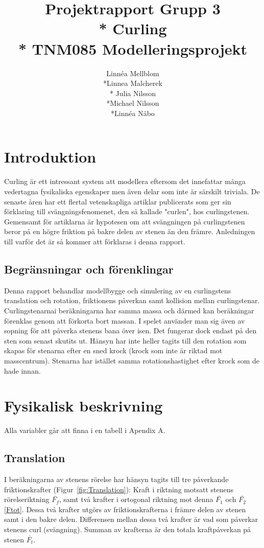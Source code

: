 \documentclass[11pt]{article} %
\title{Projektrapport Grupp 3 \\* 
Curling\\*
TNM085 Modelleringsprojekt}
\author{Linnéa Mellblom\\*Linnea Malcherek\\* Julia Nilsson\\*Michael Nilsson\\*Linnéa Nåbo}
\begin{document}
\maketitle
\pagebreak
{}  

\pagebreak
\tableofcontents
\pagebreak

\section{Introduktion}
Curling är ett intressant system att modellera eftersom det innefattar många vedertagna fysikaliska egenskaper men även delar som inte är särskilt triviala. 
De senaste åren har ett flertal vetenskapliga artiklar publicerats som ger sin förklaring till svängningsfenomenet, den så kallade "curlen", hos curlingstenen.
Gemensamt för artiklarna är hypotesen om att svängningen på curlingstenen beror på en högre friktion på bakre delen av stenen än den främre. 
Anledningen till varför det är så kommer att förklaras i denna rapport.

\subsection{Begränsningar och förenklingar} 
Denna rapport behandlar modellbygge och simulering av en curlingstens translation
och rotation, friktionens påverkan samt kollision mellan curlingstenar. 
Curlingstenarnai beräkningarna har samma massa och därmed kan beräkningar förenklas genom att
förkorta bort massan. I spelet använder man sig även av sopning för att påverka stenens
bana över isen. Det fungerar dock endast på den sten som senast skutits ut. Hänsyn har
inte heller tagits till den rotation som skapas för stenarna efter en sned krock (krock som
inte är riktad mot masscentrum). Stenarna har istället samma rotationshastighet efter
krock som de hade innan.

\section{Fysikalisk beskrivning} 

Alla variabler går att finna i en tabell i Apendix A.

\subsection{Translation}

I beräkningarna av stenens rörelse har hänsyn tagits till tre påverkande friktionskrafter (Figur~\ref{fig:Translation}): Kraft i riktning motsatt stenens rörelseriktning $\bar{F_f}$, samt två krafter i ortogonal riktning mot denna $\bar{F_1}$ och $\bar{F_2}$ \eqref{Ftot}. Dessa två krafter utgörs av friktionskrafterna i främre delen av stenen samt i den bakre delen. Differensen mellan dessa två krafter är vad som påverkar stenens curl (svängning). Summan av krafterna är den totala kraftpåverkan på stenen $\bar{F_t}$.
\end{document}
